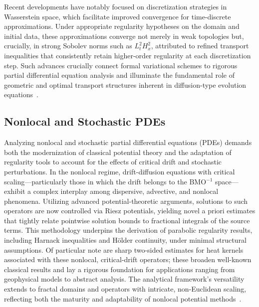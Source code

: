 Recent developments have notably focused on discretization strategies in Wasserstein space, which facilitate improved convergence for time-discrete approximations. Under appropriate regularity hypotheses on the domain and initial data, these approximations converge not merely in weak topologies but, crucially, in strong Sobolev norms such as $L^2_t H^2_x$, attributed to refined transport inequalities that consistently retain higher-order regularity at each discretization step. Such advances crucially connect formal variational schemes to rigorous partial differential equation analysis and illuminate the fundamental role of geometric and optimal transport structures inherent in diffusion-type evolution equations~\cite{ref96}.

\subsection{Nonlocal and Stochastic PDEs}

Analyzing nonlocal and stochastic partial differential equations (PDEs) demands both the modernization of classical potential theory and the adaptation of regularity tools to account for the effects of critical drift and stochastic perturbations. In the nonlocal regime, drift-diffusion equations with critical scaling—particularly those in which the drift belongs to the BMO$^{-1}$ space—exhibit a complex interplay among dispersive, advective, and nonlocal phenomena. Utilizing advanced potential-theoretic arguments, solutions to such operators are now controlled via Riesz potentials, yielding novel a priori estimates that tightly relate pointwise solution bounds to fractional integrals of the source terms. This methodology underpins the derivation of parabolic regularity results, including Harnack inequalities and Hölder continuity, under minimal structural assumptions. Of particular note are sharp two-sided estimates for heat kernels associated with these nonlocal, critical-drift operators; these broaden well-known classical results and lay a rigorous foundation for applications ranging from geophysical models to abstract analysis. The analytical framework's versatility extends to fractal domains and operators with intricate, non-Euclidean scaling, reflecting both the maturity and adaptability of nonlocal potential methods~\cite{ref95}.

